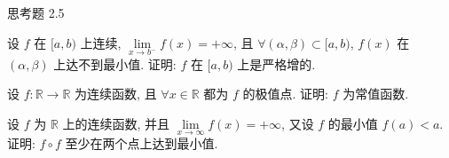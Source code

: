 \begin{exblock}{思考题 2.5}
\item 设 $f$ 在 $[a,b)$ 上连续, $\lim\limits_{x \to b^-} f(x) = +\infty$, 且 $\forall (\alpha, \beta) \subset [a,b)$, $f(x)$ 在 $(\alpha, \beta)$ 上达不到最小值. 证明: $f$ 在 $[a,b)$ 上是严格增的.

\item 设 $f\colon \mathbb{R} \to \mathbb{R}$ 为连续函数, 且 $\forall x \in \mathbb{R}$ 都为 $f$ 的极值点. 证明: $f$ 为常值函数.

\item 设 $f$ 为 $\mathbb{R}$ 上的连续函数, 并且 $\lim\limits_{x \to \infty} f(x) = +\infty$, 又设 $f$ 的最小值 $f(a) < a$. 证明: $f \circ f$ 至少在两个点上达到最小值.
\end{exblock}
